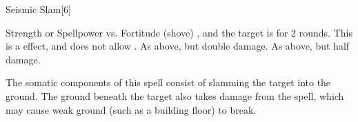 \begin{spellsection}{Seismic Slam}[6]
    \begin{spellheader}
    \end{spellheader}
    \begin{spellcontent}
        \begin{spelltargetinginfo}
        \end{spelltargetinginfo}
        \begin{spelleffects}
            \begin{spellattack}{Strength or Spellpower vs. Fortitude (shove)}
                \spellsuccess {}, and the target is \immobilized for 2 rounds.
                This is a  effect, and does not allow .
                \spellcritical As above, but double damage.
                \spellfailure As above, but half damage.
            \end{spellattack}
        \end{spelleffects}
    \end{spellcontent}
    \begin{spellfooter}
        \spellnotes The somatic components of this spell consist of slamming the target into the ground. The ground beneath the target also takes damage from the spell, which may cause weak ground (such as a building floor) to break.
        \miscastexplode
    \end{spellfooter}
    \begin{spellaugments}
    \end{spellaugments}
\end{spellsection}

